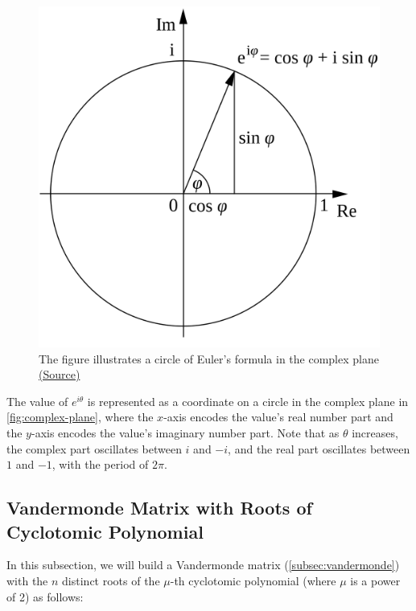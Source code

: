 \begin{figure}[!h]
    \centering
  \includegraphics[width=0.4\linewidth]{figures/euler-formula.png}
  \caption{The figure illustrates a circle of Euler's formula in the complex plane \href{https://en.wikipedia.org/wiki/Euler's_formula}{(Source)}}
\end{figure}

The value of $e^{i\theta}$ is represented as a coordinate on a circle in the complex plane in \autoref{fig:complex-plane}, where the $x$-axis encodes the value's real number part and the $y$-axis encodes the value's imaginary number part. Note that as $\theta$ increases, the complex part oscillates between $i$ and $-i$, and the real part oscillates between $1$ and $-1$, with the period of $2\pi$. 


\subsection{Vandermonde Matrix with Roots of Cyclotomic Polynomial}
\label{subsec:vandermonde-euler}

 
 
In this subsection, we will build a Vandermonde matrix (\autoref{subsec:vandermonde}) with the $n$ distinct roots of the $\mu$-th cyclotomic polynomial (where $\mu$ is a power of 2) as follows:



